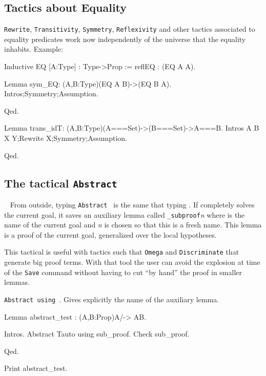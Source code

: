 \documentclass[11pt]{article}
\begin{document}
\begin{coq_example*}
\subsection{Tactics about Equality}\label{equality}
\texttt{Rewrite}, \texttt{Transitivity}, \texttt{Symmetry},
\texttt{Reflexivity} and other tactics associated to equality predicates work
now independently of the universe that the equality inhabits.
Example:

\begin{coq_example*} 
Inductive EQ [A:Type] : Type->Prop := reflEQ : (EQ A A).
\end{coq_example*} 
\begin{coq_example} 
Lemma sym_EQ: (A,B:Type)(EQ A B)->(EQ B A).
Intros;Symmetry;Assumption.
\end{coq_example} 
\begin{coq_example*} 
Qed.
\end{coq_example*} 

\begin{coq_example} 
Lemma trans_idT: (A,B:Type)(A===Set)->(B===Set)->A===B.
Intros A B X Y;Rewrite X;Symmetry;Assumption.
\end{coq_example} 
\begin{coq_example*} 
Qed.
\end{coq_example*} 


\subsection{The tactical \texttt{Abstract}}~\label{abstract}
From outside, typing \texttt{Abstract \tac} is the same that
typing \tac. If \tac{} completely solves the current goal, it saves an auxiliary lemma called 
{\ident}\texttt{\_subproof}\textit{n} where {\ident} is the name of the
current goal and \textit{n} is chosen so that this is a fresh
name. This lemma is a proof of the current goal, generalized over the
local hypotheses.

This tactical is useful with tactics such that \texttt{Omega} and
\texttt{Discriminate} that generate big proof terms. With that tool
the user can avoid the explosion at time of the \texttt{Save} command
without having to cut ``by hand'' the proof in smaller lemmas.

\begin{Variants}
\item \texttt{Abstract {\tac} using {\ident}}. Gives explicitly the
  name of the auxiliary lemma.
\end{Variants}
\begin{coq_example*} 
Lemma abstract_test : (A,B:Prop)A/\B -> A\/B.
\end{coq_example*} 
\begin{coq_example} 
Intros.
Abstract Tauto using sub_proof.
Check sub_proof.
\end{coq_example} 
\begin{coq_example*} 
Qed.
\end{coq_example*} 
\begin{coq_example} 
Print abstract_test.
\end{coq_example} 



\end{coq_example*}
\end{document}
